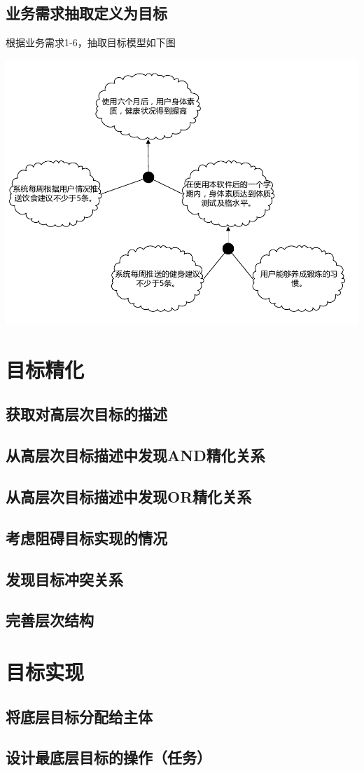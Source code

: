 \documentclass[UTF8]{ctexart}
\begin{document}
\subsection{业务需求抽取定义为目标}
根据业务需求1-6，抽取目标模型如下图

\includegraphics[scale=0.90]{br.pdf}

\section{目标精化}
\subsection{获取对高层次目标的描述}

\subsection{从高层次目标描述中发现AND精化关系}
\subsection{从高层次目标描述中发现OR精化关系}
\subsection{考虑阻碍目标实现的情况}
\subsection{发现目标冲突关系}
\subsection{完善层次结构}

\section{目标实现}
\subsection{将底层目标分配给主体}
\subsection{设计最底层目标的操作（任务）}
\end{document}
